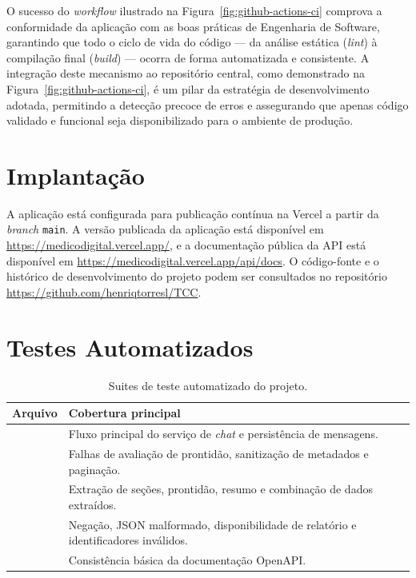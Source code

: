 \begin{apendicesenv}
O sucesso do \textit{workflow} ilustrado na Figura~\ref{fig:github-actions-ci} comprova a conformidade da aplicação com as 
boas práticas de Engenharia de Software, garantindo que todo o ciclo de vida do código — 
da análise estática (\textit{lint}) à compilação final (\textit{build}) — ocorra de forma automatizada e consistente. 
A integração deste mecanismo ao repositório central, como demonstrado na Figura~\ref{fig:github-actions-ci}, é um pilar da estratégia de desenvolvimento adotada, 
permitindo a detecção precoce de erros e assegurando que apenas código validado e funcional seja disponibilizado para o ambiente de produção.

\section{Implantação}
\label{ap:testes-implantacao}

A aplicação está configurada para publicação contínua na Vercel a partir da \textit{branch}
\texttt{main}. A versão publicada da aplicação está disponível em
\url{https://medicodigital.vercel.app/}, e a documentação pública da API está disponível em
\url{https://medicodigital.vercel.app/api/docs}. O código-fonte e o histórico de desenvolvimento
do projeto podem ser consultados no repositório
\url{https://github.com/henriqtorresl/TCC}.

\end{apendicesenv}

\section{Testes Automatizados}
\label{ap:testes-automatizados}

\begin{table}[htb]
\centering
\caption{Suites de teste automatizado do projeto.}
\label{tab:testes-automatizados}
\begin{tabularx}{\textwidth}{p{5.1cm}Y}
\hline
Arquivo & Cobertura principal \\
\hline
{} & Fluxo principal do serviço de \textit{chat} e persistência de mensagens. \\
 & Falhas de avaliação de prontidão, sanitização de metadados e paginação. \\
 & Extração de seções, prontidão, resumo e combinação de dados extraídos. \\
 & Negação, JSON malformado, disponibilidade de relatório e identificadores inválidos. \\
 & Consistência básica da documentação OpenAPI. \\
\hline
\end{tabularx}
\end{table}

